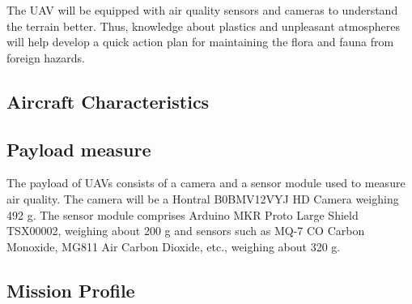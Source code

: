 \documentclass[12 pt]{article}
\begin{document}
The UAV will be equipped with air quality sensors and cameras to understand the terrain better. Thus, knowledge about plastics and unpleasant atmospheres will help develop a quick action plan for maintaining the flora and fauna from foreign hazards.

\subsection{Aircraft Characteristics}
\begin{table}[h]
\centering
{}
\end{table}

\subsection{Payload measure}
The payload of UAVs consists of a camera and a sensor module used to measure air quality. The camera will be a Hontral B0BMV12VYJ HD Camera weighing 492 g. The sensor module comprises Arduino MKR Proto Large Shield TSX00002, weighing about 200 g and sensors such as MQ-7 CO Carbon Monoxide, MG811 Air Carbon Dioxide, etc., weighing about 320 g.

\subsection{Mission Profile}
\end{document}
